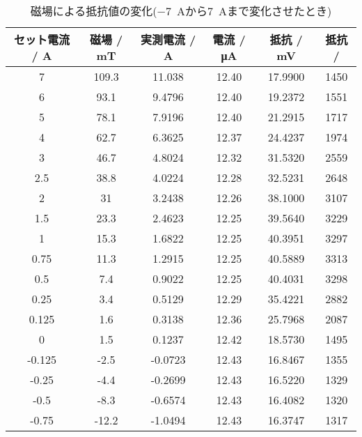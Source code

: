 \begin{table}[!ht]
	\centering
	\caption{磁場による抵抗値の変化(\SI{-7}{A}から\SI{7}{A}まで変化させたとき)}
	\label{tab:-7to7}
	\begin{tabular}{cccccc}
		\hline
		セット電流 / A & 磁場 / mT & 実測電流 / A & 電流 / \si{\micro A} & 抵抗 / \si{mV} & 抵抗 / \Omega \\ \hline
		7         & 109.3   & 11.038   & 12.40              & 17.9900      & 1450        \\
		6         & 93.1    & 9.4796   & 12.40              & 19.2372      & 1551        \\
		5         & 78.1    & 7.9196   & 12.40              & 21.2915      & 1717        \\
		4         & 62.7    & 6.3625   & 12.37              & 24.4237      & 1974        \\
		3         & 46.7    & 4.8024   & 12.32              & 31.5320      & 2559        \\
		2.5       & 38.8    & 4.0224   & 12.28              & 32.5231      & 2648        \\
		2         & 31      & 3.2438   & 12.26              & 38.1000      & 3107        \\
		1.5       & 23.3    & 2.4623   & 12.25              & 39.5640      & 3229        \\
		1         & 15.3    & 1.6822   & 12.25              & 40.3951      & 3297        \\
		0.75      & 11.3    & 1.2915   & 12.25              & 40.5889      & 3313        \\
		0.5       & 7.4     & 0.9022   & 12.25              & 40.4031      & 3298        \\
		0.25      & 3.4     & 0.5129   & 12.29              & 35.4221      & 2882        \\
		0.125     & 1.6     & 0.3138   & 12.36              & 25.7968      & 2087        \\
		0         & 1.5     & 0.1237   & 12.42              & 18.5730      & 1495        \\
		-0.125    & -2.5    & -0.0723  & 12.43              & 16.8467      & 1355        \\
		-0.25     & -4.4    & -0.2699  & 12.43              & 16.5220      & 1329        \\
		-0.5      & -8.3    & -0.6574  & 12.43              & 16.4082      & 1320        \\
		-0.75     & -12.2   & -1.0494  & 12.43              & 16.3747      & 1317        \\

\end{tabular}
\end{table}
